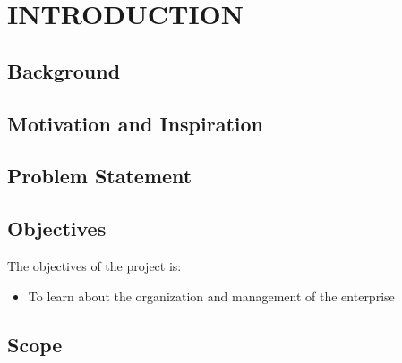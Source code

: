 \setcounter{page}{1}
\chapter{INTRODUCTION}
    \section{Background}
    

    \section{Motivation and Inspiration}
    
    \section{Problem Statement}
    
    
    \section{Objectives}
    The objectives of the project is:
        \begin{itemize}
        \setlength\itemsep{1.5pt}
        \item To learn about the organization and management of the enterprise

        \end{itemize}


    \section{Scope}
    